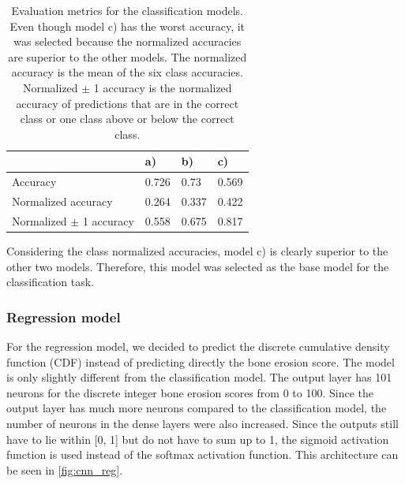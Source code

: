 \documentclass[12pt]{article}
\begin{document}
\begin{table}[ht]
\centering
\caption{Evaluation metrics for the classification models. Even though model c) has the worst accuracy, it was selected because the normalized accuracies are superior to the other models. The normalized accuracy is the mean of the six class accuracies. Normalized $\pm$ 1 accuracy is the normalized accuracy of predictions that are in the correct class or one class above or below the correct class.}
\label{tab:metrics_cla}
\begin{tabular}{@{}llll@{}}
\toprule
                                & a)    & b)    & c)    \\ \midrule
Accuracy                        & 0.726 & 0.73 & 0.569 \\
Normalized accuracy       & 0.264 & 0.337 & 0.422 \\
Normalized $\pm$ 1 accuracy  & 0.558 & 0.675 & 0.817 \\ \bottomrule
\end{tabular}
\end{table}

Considering the class normalized accuracies, model c) is clearly superior to the other two models. Therefore, this model was selected as the base model for the classification task.

\subsubsection{Regression model}
\label{subsubsec:reg}


For the regression model, we decided to predict the discrete cumulative density function (CDF) instead of predicting directly the bone erosion score. The model is only slightly different from the classification model. The output layer has 101 neurons for the discrete integer bone erosion scores from 0 to 100. Since the output layer has much more neurons compared to the classification model, the number of neurons in the dense layers were also increased. Since the outputs still have to lie within [0, 1] but do not have to sum up to 1, the sigmoid activation function is used instead of the softmax activation function. This architecture can be seen in \autoref{fig:cnn_reg}.
\end{document}
